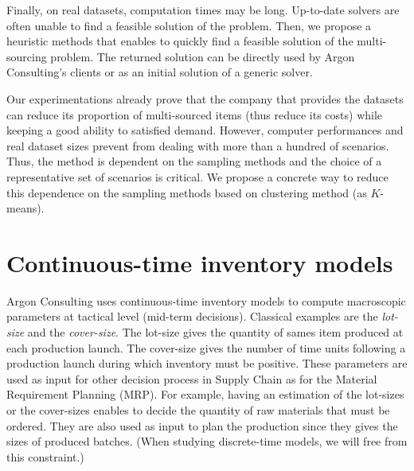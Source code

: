 \medskip


Finally, on real datasets, computation times may be long.
Up-to-date solvers are often unable to find a feasible solution of the problem.
Then, we propose a heuristic methods that enables to quickly find a feasible solution of the multi-sourcing problem.
The returned solution can be directly used by Argon Consulting's clients or as an initial solution of a generic solver.


\medskip


Our experimentations already prove that the company that provides the datasets can reduce its proportion of multi-sourced items (thus reduce its costs) while keeping a good ability to satisfied demand.
However, computer performances and real dataset sizes prevent from dealing with more than a hundred of scenarios.
Thus, the method is dependent on the sampling methods and the choice of a representative set of scenarios is critical.
We propose a concrete way to reduce this dependence on the sampling methods based on clustering method (as $K$-means).



\section{Continuous-time inventory models}
\label{sec:intro:en:continuous-time-inventory-models}


Argon Consulting uses continuous-time inventory models to compute macroscopic parameters at tactical level (mid-term decisions).
Classical examples are the \emph{lot-size} and the \emph{cover-size}.
The lot-size gives the quantity of sames item produced at each production launch.
The cover-size gives the number of time units following a production launch during which inventory must be positive.
These parameters are used as input for other decision process in Supply Chain as for the Material Requirement Planning (MRP).
For example, having an estimation of the lot-sizes or the cover-sizes enables to decide the quantity of raw materials that must be ordered.
They are also used as input to plan the production since they gives the sizes of produced batches.
(When studying discrete-time models, we will free from this constraint.)


